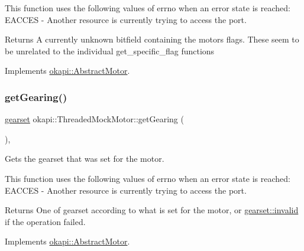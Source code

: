 This function uses the following values of errno when an error state is reached\+: E\+A\+C\+C\+ES -\/ Another resource is currently trying to access the port.

\begin{DoxyReturn}{Returns}
A currently unknown bitfield containing the motor\textquotesingle{}s flags. These seem to be unrelated to the individual get\+\_\+specific\+\_\+flag functions 
\end{DoxyReturn}


Implements \mbox{\hyperlink{classokapi_1_1AbstractMotor_aaae44487bf20ac2e18b52ee57b7a06ad}{okapi\+::\+Abstract\+Motor}}.

\mbox{\label{classokapi_1_1ThreadedMockMotor_acbc36f09b40e1d8c18bbefec6b8ad86d}} 
\subsubsection{\texorpdfstring{getGearing()}{getGearing()}}
{\footnotesize\ttfamily \mbox{\hyperlink{classokapi_1_1AbstractMotor_a88aaa6ea2fa10f5520a537bbf26774d5}{gearset}} okapi\+::\+Threaded\+Mock\+Motor\+::get\+Gearing (\begin{DoxyParamCaption}{ }\end{DoxyParamCaption})\hspace{0.3cm}{\ttfamily [override]}, {\ttfamily [virtual]}}



Gets the gearset that was set for the motor. 

This function uses the following values of errno when an error state is reached\+: E\+A\+C\+C\+ES -\/ Another resource is currently trying to access the port.

\begin{DoxyReturn}{Returns}
One of gearset according to what is set for the motor, or \mbox{\hyperlink{classokapi_1_1AbstractMotor_a88aaa6ea2fa10f5520a537bbf26774d5afedb2d84cafe20862cb4399751a8a7e3}{gearset\+::invalid}} if the operation failed. 
\end{DoxyReturn}


Implements \mbox{\hyperlink{classokapi_1_1AbstractMotor_adc90f1fc8af6c34c4e833355693474bb}{okapi\+::\+Abstract\+Motor}}.

\mbox{\label{classokapi_1_1ThreadedMockMotor_aa728374b77bd0a29af4b8715d782b241}} 
